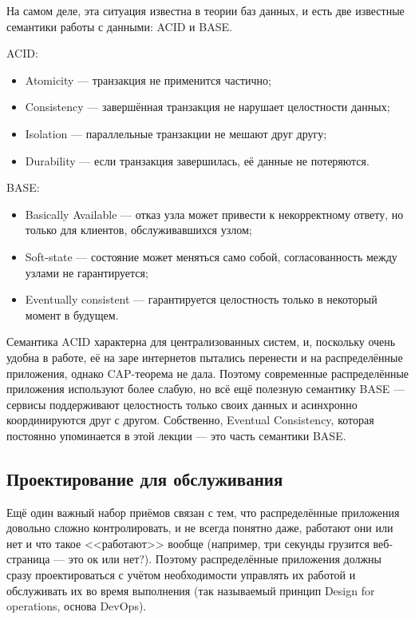 \documentclass{../text-style}
\begin{document}
На самом деле, эта ситуация известна в теории баз данных, и есть две известные семантики работы с данными: ACID и BASE.

ACID:
\begin{itemize}
    \item Atomicity --- транзакция не применится частично;
    \item Consistency --- завершённая транзакция не нарушает целостности данных;
    \item Isolation --- параллельные транзакции не мешают друг другу;
    \item Durability --- если транзакция завершилась, её данные не потеряются.
\end{itemize}

BASE:
\begin{itemize}
    \item Basically Available --- отказ узла может привести к некорректному ответу, но только для клиентов, обслуживавшихся узлом;
    \item Soft-state --- состояние может меняться само собой, согласованность между узлами не гарантируется;
    \item Eventually consistent --- гарантируется целостность только в некоторый момент в будущем.
\end{itemize}

Семантика ACID характерна для централизованных систем, и, поскольку очень удобна в работе, её на заре интернетов пытались перенести и на распределённые приложения, однако CAP-теорема не дала. Поэтому современные распределённые приложения используют более слабую, но всё ещё полезную семантику BASE --- сервисы поддерживают целостность только своих данных и асинхронно координируются друг с другом. Собственно, Eventual Consistency, которая постоянно упоминается в этой лекции --- это часть семантики BASE.

\subsection{Проектирование для обслуживания}

Ещё один важный набор приёмов связан с тем, что распределённые приложения довольно сложно контролировать, и не всегда понятно даже, работают они или нет и что такое <<работают>> вообще (например, три секунды грузится веб-страница --- это ок или нет?). Поэтому распределённые приложения должны сразу проектироваться с учётом необходимости управлять их работой и обслуживать их во время выполнения (так называемый принцип Design for operations, основа DevOps).
\end{document}
